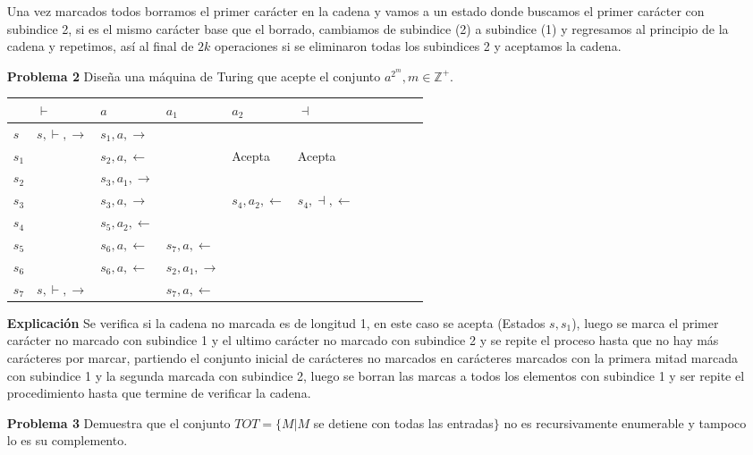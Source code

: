\documentclass{article}
\begin{document}
\begin{enumerate}
Una vez marcados todos borramos el primer carácter en la cadena y vamos a un estado donde buscamos el primer carácter con subindice 2, si es el mismo carácter base que el borrado, cambiamos de subindice (2) a subindice (1) y regresamos al principio de la cadena y repetimos, así al final de $2k$ operaciones si se eliminaron todas los subindices 2 y aceptamos la cadena. 


\item[\bf{Problema 2}] Diseña una máquina de Turing que acepte el conjunto ${a^{2^m}, m \in \mathbb{Z}^+}$.

\begin{tabular}{|l||l|l|l|l|l|l|l|l|l|l|}
  \hline
   & $\vdash$ &$a$& $a_1$ & $a_2$ & $\dashv$ \\
  \hline  
  \hline  
  $s$      & $s,\vdash,\rightarrow$ &  $s_1,a,\rightarrow$ &  &  &  \\  
  \hline
  $s_1$    &  &  $s_2,a,\leftarrow$ &  &  Acepta  & Acepta  \\
  \hline  
  $s_2$    &  &  $s_3,a_1,\rightarrow$ &  &    &   \\
  \hline  
  $s_3$   &  &  $s_3,a,\rightarrow$ &  &  $s_4,a_2,\leftarrow$  & $s_4,\dashv,\leftarrow$  \\
   \hline  
  $s_4$   &  &  $s_5,a_2,\leftarrow$ &  &  &  \\
  \hline  
  $s_5$  &   &  $s_6,a,\leftarrow$  & $s_7,a,\leftarrow$  &   &  \\
  \hline  
  $s_6$  &   &  $s_6,a,\leftarrow$  & $s_2,a_1,\rightarrow$  &   &  \\
  \hline  
  $s_7$  & $s,\vdash,\rightarrow$  &   & $s_7,a,\leftarrow$  &   &  \\
  \hline  
\end{tabular}

\item[\bf{Explicación}] Se verifica si la cadena no marcada es de longitud 1, en este caso se acepta (Estados $s,s_1$), luego se marca el primer carácter no marcado con subindice 1 y el ultimo carácter no marcado con subindice 2 y se repite el proceso hasta que no hay más carácteres por marcar, partiendo el conjunto inicial de carácteres no marcados en carácteres marcados con la primera mitad marcada con subindice 1 y la segunda marcada con subindice 2, luego se borran las marcas a todos los elementos con subindice 1 y ser repite el procedimiento hasta que termine de verificar la cadena.

\item[\bf{Problema 3}] Demuestra que el conjunto $TOT = \{ M | M $ se detiene con todas las entradas$ \}$ no es recursivamente enumerable y tampoco lo es su complemento.


\end{enumerate}
\end{document}
